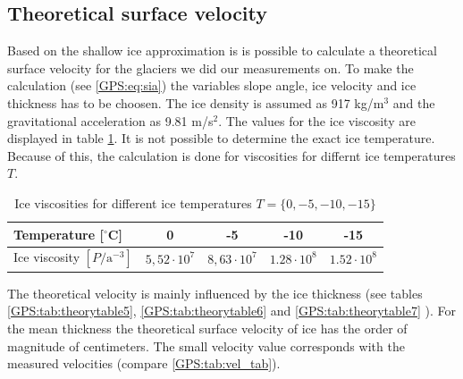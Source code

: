 \subsection{Theoretical surface velocity}
Based on the shallow ice approximation is is possible to calculate a theoretical surface velocity for the glaciers we did our measurements on.
To make the calculation (see \ref{GPS:eq:sia}) the variables slope angle, ice velocity and ice thickness has to be choosen. 
The ice density is assumed as 917 kg/m$^3$ and the gravitational acceleration as 9.81  m/s$^2$.
The values for the ice viscosity are displayed in table \ref{GPS:tab:iceviscosities}.
It is not possible to determine the exact ice temperature.
Because of this, the calculation is done for viscosities for differnt ice temperatures $T$.

\begin{table}[H]
\centering
\begin{tabular}{lcccc}
\toprule
Temperature [$^\circ$C] & 0 & -5 & -10 & -15 \\
\midrule
Ice viscosity $\left[ P / \text{a}^{-3} \right]$ & $5,52 \cdot 10^7$ & $8,63 \cdot 10^7$ & $1.28 \cdot 10^8$ & $1.52 \cdot 10^8$\\
\bottomrule
\end{tabular}
\caption{Ice viscosities for different ice temperatures $T = \{0,-5,-10,-15\}$}
\label{GPS:tab:iceviscosities}
\end{table}

The theoretical velocity is mainly influenced by the ice thickness (see tables \ref{GPS:tab:theorytable5}, \ref{GPS:tab:theorytable6} and \ref{GPS:tab:theorytable7} ).
For the mean thickness the theoretical surface velocity of ice has the order of magnitude of centimeters. 
The small velocity value corresponds with the measured velocities (compare \ref{GPS:tab:vel_tab}). 

